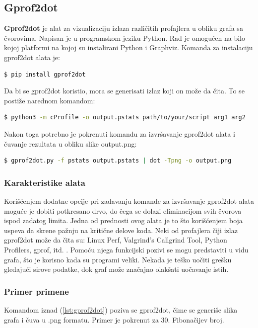 \documentclass[a4paper]{article}
\begin{document}
\subsection{Gprof2dot}
\label{profajler_5}
\textbf{Gprof2dot} je alat za vizualizaciju izlaza različitih profajlera u obliku grafa sa čvorovima. Napisan je u programskom jeziku Python. Rad je omogućen na bilo kojoj platformi na kojoj su instalirani Python i Graphviz. Komanda za instalaciju gprof2dot alata je:
\begin{lstlisting}[language=bash, belowskip=-\baselineskip] 
  $ pip install gprof2dot
\end{lstlisting}
Da bi se gprof2dot koristio, mora se generisati izlaz koji on može da čita. To se postiže narednom komandom:
\begin{lstlisting}[language=bash, belowskip=-\baselineskip]
  $ python3 -m cProfile -o output.pstats path/to/your/script arg1 arg2
\end{lstlisting}
Nakon toga potrebno je pokrenuti komandu za izvršavanje gprof2dot alata i čuvanje rezultata u obliku slike output.png:
\begin{lstlisting}[language=bash, frame=single, label=lst:gprof2dot, belowskip=-\baselineskip]
  $ gprof2dot.py -f pstats output.pstats | dot -Tpng -o output.png
\end{lstlisting}
\subsubsection{Karakteristike alata}
Korišćenjem dodatne opcije pri zadavanju komande za izvršavanje gprof2dot alata moguće je dobiti potkresano drvo, do čega se dolazi eliminacijom svih čvorova ispod zadatog limita. Jedna od prednosti ovog alata je to što korišćenjem boja uspeva da skrene pažnju na kritične delove koda. Neki od profajlera čiji izlaz gprof2dot može da čita su: Linux Perf, Valgrind's Callgrind Tool, Python Profilers, gprof, itd. \cite{gprof}. Pomoću njega funkcijski pozivi se mogu predstaviti u vidu grafa, što je korisno kada su programi veliki. Nekada je teško uočiti grešku gledajući sirove podatke, dok graf može značajno olakšati uočavanje istih. 
\subsubsection{Primer primene}
Komandom iznad (\ref{lst:gprof2dot}) poziva se gprof2dot, čime se generiše slika grafa i čuva u .png formatu. Primer je pokrenut za 30. Fibonačijev broj.
\end{document}
